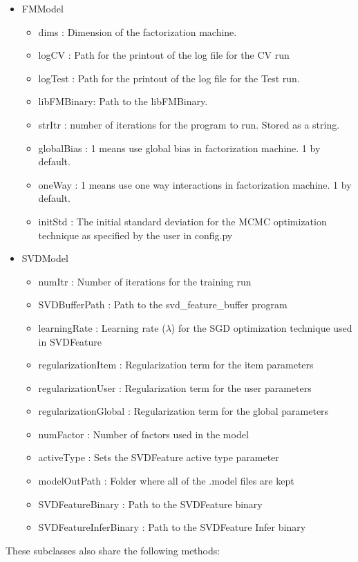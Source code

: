 \documentclass{article}
\begin{document}
\begin{itemize}
	\item FMModel
 
\begin{itemize}
	\item dims : Dimension of the factorization machine.
	\item logCV : Path for the printout of the log file for the CV run \item logTest : Path for the printout of the log file for the Test run. 
	\item libFMBinary: Path to the libFMBinary.
	\item strItr : number of iterations for the program to run. Stored as a string.
	\item globalBias : 1 means use global bias in factorization machine. 1 by default.
	\item oneWay : 1 means use one way interactions in factorization machine. 1 by default.  
	\item initStd : The initial standard deviation for the MCMC optimization technique as specified by the user in config.py
\end{itemize}

	\item SVDModel
\begin{itemize}
	\item numItr : Number of iterations for the training run 
	\item SVDBufferPath : Path to the svd\_feature\_buffer program 
	\item learningRate : Learning rate ($\lambda$) for the SGD optimization technique used in SVDFeature 
	\item regularizationItem : Regularization term for the item parameters 
	\item regularizationUser : Regularization term for the user parameters 
	\item regularizationGlobal : Regularization term for the global parameters 
	\item numFactor : Number of factors used in the model 
	\item activeType : Sets the SVDFeature active type parameter 
	\item modelOutPath : Folder where all of the .model files are kept 
	\item SVDFeatureBinary : Path to the SVDFeature binary 
	\item SVDFeatureInferBinary : Path to the SVDFeature Infer binary
\end{itemize}
\end{itemize}
These subclasses also share the following methods:
\end{document}
